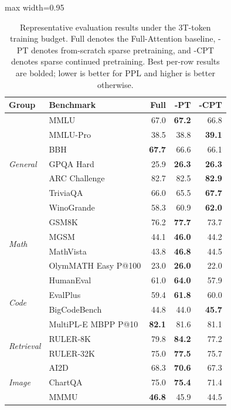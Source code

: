 \begin{table}[H]
\centering
\caption{Representative evaluation results under the 3T-token training budget. Full denotes the Full-Attention baseline, \method{}-PT denotes from-scratch sparse pretraining, and \method{}-CPT denotes sparse continued pretraining. Best per-row results are bolded; lower is better for PPL and higher is better otherwise.}
\label{tab:pretrain-representative}
{\small
\renewcommand{\arraystretch}{0.92}
\begin{adjustbox}{max width=0.95\linewidth}
\begin{tabular}{llrrr}
\toprule
Group & Benchmark & Full & \method{}-PT & \method{}-CPT \\
\midrule
\multirow{7}{*}{\textit{General}} & MMLU & 67.0 & \textbf{67.2} & 66.8 \\
 & MMLU-Pro & 38.5 & 38.8 & \textbf{39.1} \\
 & BBH & \textbf{67.7} & 66.6 & 66.1 \\
 & GPQA Hard & 25.9 & \textbf{26.3} & \textbf{26.3} \\
 & ARC Challenge & 82.7 & 82.5 & \textbf{82.9} \\
 & TriviaQA & 66.0 & 65.5 & \textbf{67.7} \\
 & WinoGrande & 58.3 & 60.9 & \textbf{62.0} \\
\midrule
\multirow{4}{*}{\textit{Math}} & GSM8K & 76.2 & \textbf{77.7} & 73.7 \\
 & MGSM & 44.1 & \textbf{46.0} & 44.2 \\
 & MathVista & 43.8 & \textbf{46.8} & 44.5 \\
 & OlymMATH Easy P@100 & 23.0 & \textbf{26.0} & 22.0 \\
\midrule
\multirow{4}{*}{\textit{Code}} & HumanEval & 61.0 & \textbf{64.0} & 57.9 \\
 & EvalPlus & 59.4 & \textbf{61.8} & 60.0 \\
 & BigCodeBench & 44.8 & 44.0 & \textbf{45.7} \\
 & MultiPL-E MBPP P@10 & \textbf{82.1} & 81.6 & 81.1 \\
\midrule
\multirow{2}{*}{\textit{Retrieval}} & RULER-8K & 79.8 & \textbf{84.2} & 77.2 \\
 & RULER-32K & 75.0 & \textbf{77.5} & 75.7 \\
\midrule
\multirow{7}{*}{\textit{Image}} & AI2D & 68.3 & \textbf{70.6} & 67.3 \\
 & ChartQA & 75.0 & \textbf{75.4} & 71.4 \\
 & MMMU & \textbf{46.8} & 45.9 & 44.5 \\

\end{tabular}
\end{adjustbox}}
\end{table}
